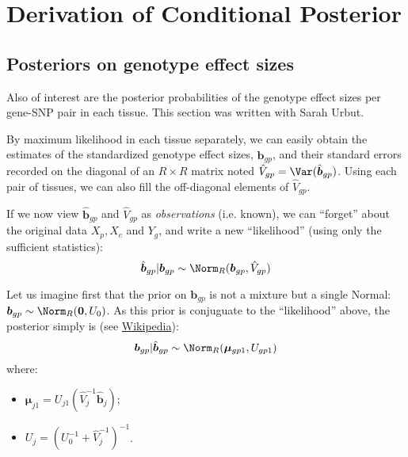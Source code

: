 \documentclass[11pt, oneside]{article}   	%
\begin{document}
\section{Derivation of Conditional Posterior}


\subsection{Posteriors on genotype effect sizes}

Also of interest are the posterior probabilities of the genotype effect sizes per gene-SNP pair in each tissue. This section was written with Sarah Urbut.

By maximum likelihood in each tissue separately, we can easily obtain the estimates of the standardized genotype effect sizes, $\hat{\bm{b}}_{gp}$, and their standard errors recorded on the diagonal of an $R \times R$ matrix noted $\hat{V}_{gp} = \Var(\hat{\bm{b}}_{gp})$.
Using each pair of tissues, we can also fill the off-diagonal elements of $\hat{V}_{gp}$.

If we now view $\hat{\bm{b}}_{gp}$ and $\hat{V}_{gp}$ as \emph{observations} (i.e. known), we can ``forget'' about the original data $X_p,X_c$ and $Y_g$, and  write a new ``likelihood'' (using only the sufficient statistics):
\begin{equation}
  \label{new_lik}
  \hat{\bm{b}}_{gp} | \bm{b}_{gp} \sim \Norm_R(\bm{b}_{gp}, \hat{V}_{gp})
\end{equation}


Let us imagine first that the prior on $\bm{b}_{gp}$ is not a mixture but a single Normal: $\bm{b}_{gp} \sim \Norm_R(\bm{0}, U_{0})$.
As this prior is conjuguate to the ``likelihood'' above, the posterior simply is (see \href{http://en.wikipedia.org/wiki/Conjugate_prior#Continuous_distributions}{Wikipedia}):
\[
\bm{b}_{gp} | \hat{\bm{b}}_{gp} \sim \Norm_R(\bm{\mu}_{gp1}, U_{gp1})
\]
where:
\begin{itemize}
\item $\bm{\mu}_{j1} = U_{j1} (\hat{V}_{j}^{-1} \hat{\bm{b}}_{j})$;
\item $U_{j} = (U_{0}^{-1} + \hat{V}_{j}^{-1})^{-1}$.
\end{itemize}
\end{document}
